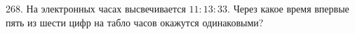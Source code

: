268. На электронных часах высвечивается $11:13:33.$ Через какое время впервые пять из шести цифр на табло часов окажутся одинаковыми?\\
